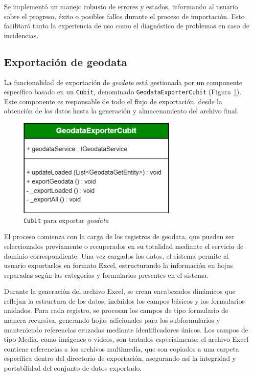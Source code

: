 \documentclass[12pt, a4paper]{book}
\begin{document}
Se implementó un manejo robusto de errores y estados, informando al usuario sobre el progreso, éxito o posibles fallos durante el proceso de importación. Esto facilitará tanto la experiencia de uso como el diagnóstico de problemas en caso de incidencias.

\subsection{Exportación de geodata}

La funcionalidad de exportación de \textit{geodata} está gestionada por un componente específico basado en un \texttt{Cubit}, denominado \texttt{GeodataExporterCubit} (Figura \ref{fig:geodataexporter}). Este componente es responsable de todo el flujo de exportación, desde la obtención de los datos hasta la generación y almacenamiento del archivo final.

\begin{figure}[H]
  \centering
  \includegraphics[width=0.7\textwidth]{images/geodata_exporter.jpg}
  \caption{\texttt{Cubit} para exportar \textit{geodata}}
  \label{fig:geodataexporter}
\end{figure}

El proceso comienza con la carga de los registros de geodata, que pueden ser seleccionados previamente o recuperados en su totalidad mediante el servicio de dominio correspondiente. Una vez cargados los datos, el sistema permite al usuario exportarlos en formato Excel, estructurando la información en hojas separadas según las categorías y formularios presentes en el sistema.

Durante la generación del archivo Excel, se crean encabezados dinámicos que reflejan la estructura de los datos, incluidos los campos básicos y los formularios anidados. Para cada registro, se procesan los campos de tipo formulario de manera recursiva, generando hojas adicionales para los subformularios y manteniendo referencias cruzadas mediante identificadores únicos. Los campos de tipo Media, como imágenes o videos, son tratados especialmente: el archivo Excel contiene referencias a los archivos multimedia, que son copiados a una carpeta específica dentro del directorio de exportación, asegurando así la integridad y portabilidad del conjunto de datos exportado.
\end{document}
